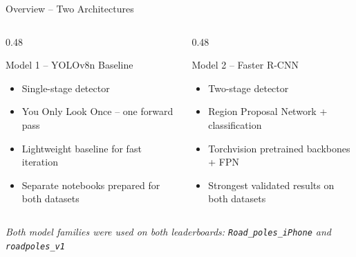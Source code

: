 \documentclass[aspectratio=169]{beamer}
\begin{document}
\begin{frame}{Overview -- Two Architectures}
  \begin{columns}
    \begin{column}{0.48\textwidth}
      \begin{block}{Model 1 -- YOLOv8n Baseline}
        \begin{itemize}
          \item Single-stage detector
          \item You Only Look Once -- one forward pass
          \item Lightweight baseline for fast iteration
          \item Separate notebooks prepared for both datasets
        \end{itemize}
      \end{block}
    \end{column}
    \begin{column}{0.48\textwidth}
      \begin{block}{Model 2 -- Faster R-CNN}
        \begin{itemize}
          \item Two-stage detector
          \item Region Proposal Network + classification
          \item Torchvision pretrained backbones + FPN
          \item Strongest validated results on both datasets
        \end{itemize}
      \end{block}
    \end{column}
  \end{columns}
  \vspace{0.5em}
  \centering
  \textit{Both model families were used on both leaderboards: \texttt{Road\_poles\_iPhone} and \texttt{roadpoles\_v1}}
\end{frame}
\end{document}
